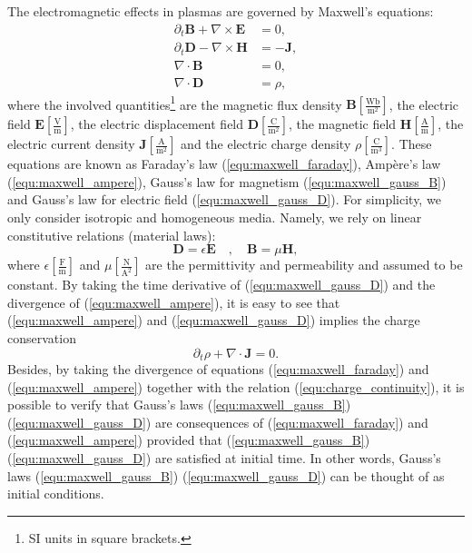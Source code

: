 \documentclass{article}
\begin{document}
The electromagnetic effects in plasmas are governed by Maxwell's equations:
\begin{subequations}
\begin{align}
    \partial_t \mathbf{B} + \nabla \times \mathbf{E} &= 0, \label{equ:maxwell_faraday} \\ 
    \partial_t \mathbf{D} - \nabla \times \mathbf{H} &= -\mathbf{J}, \label{equ:maxwell_ampere} \\
    \nabla \cdot \mathbf{B} &= 0,  \label{equ:maxwell_gauss_B}\\
    \nabla \cdot \mathbf{D} &= \rho, \label{equ:maxwell_gauss_D}
\end{align}
\end{subequations}
where the involved quantities\footnote{SI units in square brackets.} are the magnetic flux
density $\mathbf{B}[\frac{\text{Wb}}{\text{m}^2}]$, the electric field
$\mathbf{E}[\frac{\text{V}}{\text{m}}]$, the electric displacement field
$\mathbf{D}[\frac{\text{C}}{\text{m}^2}]$, the magnetic field
$\mathbf{H}[\frac{\text{A}}{\text{m}}]$, the electric current density
$\mathbf{J}[\frac{\text{A}}{\text{m}^2}]$ and the electric charge density
$\rho[\frac{\text{C}}{\text{m}^3}]$. These equations are known as Faraday's law
(\ref{equ:maxwell_faraday}), Amp\`{e}re's law (\ref{equ:maxwell_ampere}), Gauss's law for
magnetism (\ref{equ:maxwell_gauss_B}) and Gauss's law for electric field
(\ref{equ:maxwell_gauss_D}). For simplicity, we only consider isotropic and homogeneous
media. Namely, we rely on linear constitutive relations (material laws):
\begin{equation} \label{equ:material_law}
    \mathbf{D} = \epsilon \mathbf{E}\quad,\quad\mathbf{B} = \mu\mathbf{H}, 
\end{equation}
where $\epsilon[\frac{\text{F}}{\text{m}}]$ and $\mu[\frac{\text{N}}{\text{A}^{2}}]$ are
the permittivity and permeability and assumed to be constant. By taking the time
derivative of (\ref{equ:maxwell_gauss_D}) and the divergence of
(\ref{equ:maxwell_ampere}), it is easy to see that (\ref{equ:maxwell_ampere}) and
(\ref{equ:maxwell_gauss_D}) implies the charge conservation
\begin{equation} \label{equ:charge_continuity}
    \partial_t\rho + \nabla \cdot \mathbf{J} = 0.
\end{equation}
Besides, by taking the divergence of equations (\ref{equ:maxwell_faraday}) and
(\ref{equ:maxwell_ampere}) together with the relation (\ref{equ:charge_continuity}), it is
possible to verify that Gauss's laws (\ref{equ:maxwell_gauss_B})
(\ref{equ:maxwell_gauss_D}) are consequences of (\ref{equ:maxwell_faraday}) and
(\ref{equ:maxwell_ampere}) provided that (\ref{equ:maxwell_gauss_B})
(\ref{equ:maxwell_gauss_D}) are satisfied at initial time. In other words, Gauss's laws
(\ref{equ:maxwell_gauss_B}) (\ref{equ:maxwell_gauss_D}) can be thought of as initial
conditions.
\end{document}

